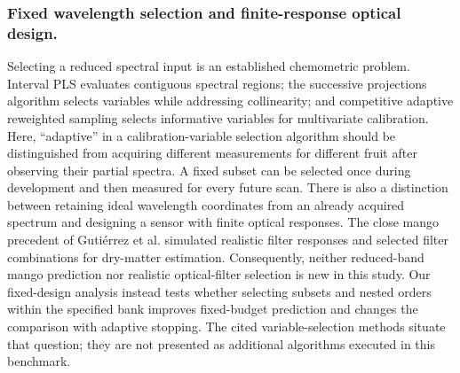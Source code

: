 \documentclass[Review,sagev,times]{sagej}
\begin{document}
\subsubsection{Fixed wavelength selection and finite-response optical design.}
Selecting a reduced spectral input is an established chemometric problem. Interval PLS evaluates contiguous spectral regions;\citep{norgaard2000ipls} the successive projections algorithm selects variables while addressing collinearity;\citep{araujo2001spa} and competitive adaptive reweighted sampling selects informative variables for multivariate calibration.\citep{li2009cars} Here, ``adaptive'' in a calibration-variable selection algorithm should be distinguished from acquiring different measurements for different fruit after observing their partial spectra. A fixed subset can be selected once during development and then measured for every future scan. There is also a distinction between retaining ideal wavelength coordinates from an already acquired spectrum and designing a sensor with finite optical responses. The close mango precedent of Guti\'{e}rrez et al.\citep{gutierrez2019} simulated realistic filter responses and selected filter combinations for dry-matter estimation. Consequently, neither reduced-band mango prediction nor realistic optical-filter selection is new in this study. Our fixed-design analysis instead tests whether selecting subsets and nested orders within the specified bank improves fixed-budget prediction and changes the comparison with adaptive stopping. The cited variable-selection methods situate that question; they are not presented as additional algorithms executed in this benchmark.
\end{document}

